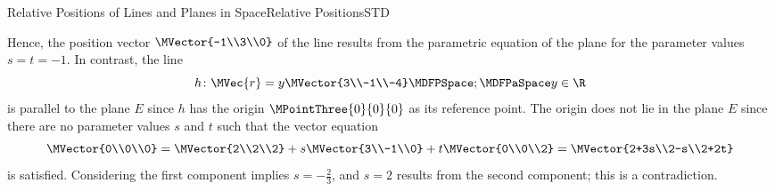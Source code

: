 \begin{MXContent}{Relative Positions of Lines and Planes in Space}{Relative Positions}{STD}
\begin{MExample}
\begin{itemize}
\[ \]
 Hence, the position vector $\MVector{-1\\3\\0}$ of the line results from the parametric equation of the plane for the parameter values 
 $s=t=-1$. In contrast, the line 
 \[
  h\colon\MVec{r}=y\MVector{3\\-1\\-4}\MDFPSpace;\MDFPaSpace y\in\R
 \]
 is parallel to the plane $E$ since $h$ has the origin $\MPointThree{0}{0}{0}$ as its reference point. The origin does not lie in the plane $E$ since there are no parameter values $s$ and $t$ such that the 
 vector equation 
 \[
  \MVector{0\\0\\0}=\MVector{2\\2\\2}+s\MVector{3\\-1\\0}+t\MVector{0\\0\\2}=\MVector{2+3s\\2-s\\2+2t}
 \]
 is satisfied. Considering the first component implies $s=-\frac{2}{3}$, and $s=2$ results from the 
 second component; this is a contradiction.
 

\end{itemize}
\end{MExample}
\end{MXContent}
